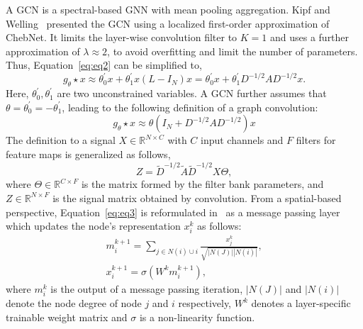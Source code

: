 A GCN is a spectral-based GNN with mean pooling aggregation. Kipf and Welling~ presented the GCN using a localized first-order approximation of ChebNet.
It limits the layer-wise convolution filter to $K=1$ and uses a further approximation of $\lambda \approx 2$, to avoid overfitting and limit the number of parameters. Thus, Equation{~\ref{eq:eq2}} can be simplified to,
\begin{equation}
g_{\theta} \star x \approx \theta_0^{'}x + \theta_1^{'}x (L-I_N)x = \theta_0^{'}x + \theta_1^{'} D^{-1/2}AD^{-1/2}x .
\end{equation}
Here, $\theta_0^{'}, \theta_1^{'}$ are two unconstrained variables. 
A GCN further assumes that $ \theta = \theta_0^{'} = -\theta_1^{'} $, leading to the
following definition of a graph convolution:
\vspace{-2pt}
\begin{equation}
g_{\theta} \star x \approx \theta (I_N + D^{-1/2} A D^{-1/2} ) x
\end{equation}
The definition to a signal $X \in \mathbb{R}^{N \times C}$ with $C$ input channels and $F$ filters for feature maps is generalized as follows,
\vspace{-2pt}
\begin{equation}
Z = \tilde{D}^{-1/2} \tilde{A}\tilde{D}^{-1/2} X \Theta ,
\label{eq:eq3}
\end{equation}
where $\Theta \in \mathbb{R}^{C \times F}$ is the matrix formed by the filter bank parameters, and $Z \in \mathbb{R}^{N \times F}$ is the signal matrix obtained by convolution.
From a spatial-based perspective, Equation{~\ref{eq:eq3}} is reformulated in{~} as a message passing layer which updates the node's representation $x_i^{k}$ as follows:
\vspace{-2pt}
\begin{equation}
\begin{split}
m_i^{k+1} = \sum_{j \in N(i) \cup i }  \frac{x_j^k}{\sqrt{ |N(J)|  |N(i)|  }} , \\
x_i^{k+1} = \sigma (W^k m_i^{k+1}), 
\label{eq:eq4}
\end{split}
\end{equation}
where $m_i^k$ is the output of a message passing iteration, $|N(J)|$ and $ |N(i)|$ denote the node degree of node $j$ and $i$ respectively, $W^k$ denotes a layer-specific trainable weight matrix and $\sigma$ is a non-linearity function.

